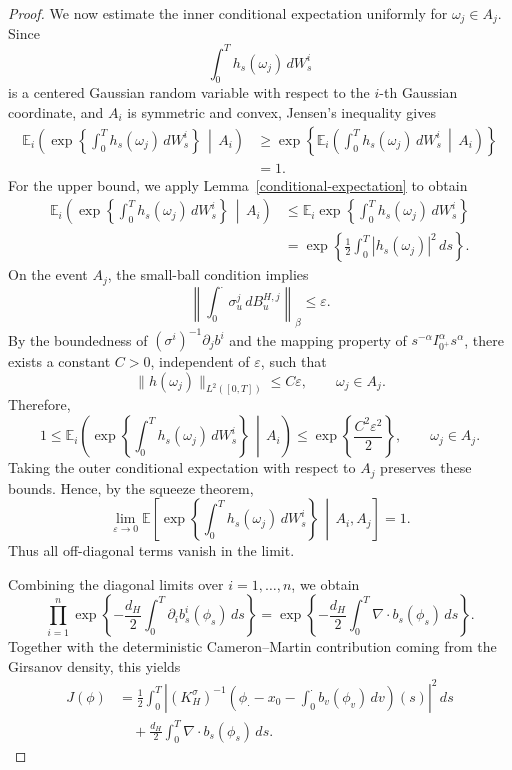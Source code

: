 \documentclass[preprint,12pt]{elsarticle}
\theoremstyle{definition}
\theoremstyle{plain}
\begin{document}
\begin{proof}
We now estimate the inner conditional expectation uniformly for
\(\omega_j\in A_j\). Since
\[
    \int_0^T h_s(\omega_j)\,dW_s^i
\]
is a centered Gaussian random variable with respect to the \(i\)-th Gaussian
coordinate, and \(A_i\) is symmetric and convex, Jensen's inequality gives
\begin{align*}
\mathbb E_i
\left(
\exp\left\{
    \int_0^T h_s(\omega_j)\,dW_s^i
\right\}
\,\middle|\,
A_i
\right)
&\geq
\exp\left\{
\mathbb E_i
\left(
    \int_0^T h_s(\omega_j)\,dW_s^i
    \,\middle|\,
    A_i
\right)
\right\}
\nonumber \\
&=1 .
\end{align*}
For the upper bound, we apply Lemma~\ref{conditional-expectation} to obtain
\begin{align*}
\mathbb E_i
\left(
\exp\left\{
    \int_0^T h_s(\omega_j)\,dW_s^i
\right\}
\,\middle|\,
A_i
\right)
&\leq
\mathbb E_i
\exp\left\{
    \int_0^T h_s(\omega_j)\,dW_s^i
\right\}
\nonumber \\
&=
\exp\left\{
    \frac12\int_0^T |h_s(\omega_j)|^2\,ds
\right\}.
\end{align*}
On the event \(A_j\), the small-ball condition implies
\[
    \left\|
    \int_0^\cdot \sigma_u^j\,dB_u^{H,j}
    \right\|_\beta
    \leq \varepsilon .
\]
By the boundedness of \((\sigma^i)^{-1}\partial_j b^i\) and the mapping
property of \(s^{-\alpha}I_{0^+}^{\alpha}s^\alpha\), there exists a constant
\(C>0\), independent of \(\varepsilon\), such that
\[
    \|h(\omega_j)\|_{L^2([0,T])}
    \leq C\varepsilon ,
    \qquad \omega_j\in A_j .
\]
Therefore,
\[
    1
    \leq
    \mathbb E_i
    \left(
    \exp\left\{
        \int_0^T h_s(\omega_j)\,dW_s^i
    \right\}
    \,\middle|\,
    A_i
    \right)
    \leq
    \exp\left\{
        \frac{C^2\varepsilon^2}{2}
    \right\},
    \qquad \omega_j\in A_j .
\]
Taking the outer conditional expectation with respect to \(A_j\) preserves
these bounds. Hence, by the squeeze theorem,
\[
\lim_{\varepsilon\to0}
\mathbb E
\left[
\exp\left\{
    \int_0^T h_s(\omega_j)\,dW_s^i
\right\}
\,\middle|\,
A_i,A_j
\right]
=
1 .
\]
Thus all off-diagonal terms vanish in the limit.

Combining the diagonal limits over \(i=1,\dots,n\), we obtain
\[
    \prod_{i=1}^n
    \exp\left\{
    -\frac{d_H}{2}
    \int_0^T \partial_i b_s^i(\phi_s)\,ds
    \right\}
    =
    \exp\left\{
    -\frac{d_H}{2}
    \int_0^T \nabla\cdot b_s(\phi_s)\,ds
    \right\}.
\]
Together with the deterministic Cameron--Martin contribution coming from the
Girsanov density, this yields
\[
\begin{aligned}
J(\phi)
&=
\frac12\int_0^T
\left|
(K_H^\sigma)^{-1}
\left(
    \phi_\cdot-x_0-\int_0^\cdot b_v(\phi_v)\,dv
\right)(s)
\right|^2\,ds  \\
&\quad
+\frac{d_H}{2}\int_0^T \nabla\cdot b_s(\phi_s)\,ds .
\end{aligned}
\]


\end{proof}
\end{document}
